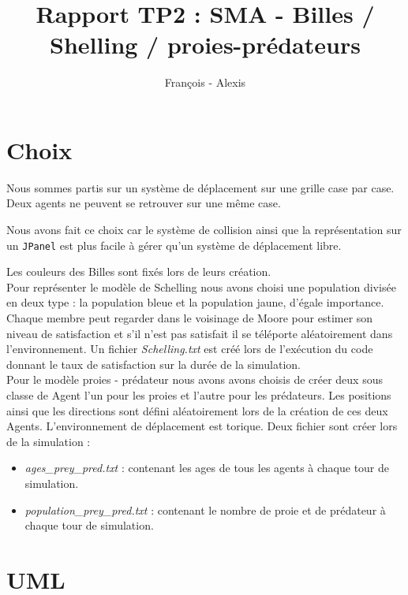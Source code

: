 \documentclass[a4paper,10pt]{article}
\title{Rapport TP2 : SMA - Billes / Shelling / proies-pr\'edateurs }
\author{Fran\c{c}ois \bsc{Lepan} - Alexis \bsc{Linke}}
\begin{document}
\maketitle

\section{Choix}

Nous sommes partis sur un syst\`eme de d\'eplacement sur une grille case par case. Deux agents ne peuvent  se retrouver sur une m\^eme case.

Nous avons fait ce choix car le syst\`eme de collision ainsi que la repr\'esentation sur un \verb&JPanel& est plus facile \`a g\'erer qu'un syst\`eme de d\'eplacement libre.

Les couleurs des Billes sont fix\'es lors de leurs cr\'eation. \\

Pour repr\'esenter le mod\`ele de Schelling nous avons choisi une population divis\'ee en deux type : la population bleue et la population jaune, d'\'egale importance. Chaque membre peut regarder dans le voisinage de Moore pour estimer son niveau de satisfaction et s'il n'est pas satisfait il se t\'el\'eporte al\'eatoirement dans l'environnement. Un fichier \emph{Schelling.txt} est cr\'e\'e lors de l'ex\'ecution du code donnant le taux de satisfaction sur la dur\'ee de la simulation. \\

Pour le mod\`ele proies - pr\'edateur nous avons avons choisis de cr\'eer deux sous classe de Agent l'un pour les proies et l'autre pour les pr\'edateurs. Les positions ainsi que les directions sont d\'efini al\'eatoirement lors de la cr\'eation de ces deux Agents. L'environnement de d\'eplacement est torique.
Deux fichier sont cr\'eer lors de la simulation : \\

\begin{itemize}
\item \emph{ages\_prey\_pred.txt} : contenant les ages de tous les agents \`a chaque tour de simulation.
\item \emph{population\_prey\_pred.txt} : contenant le nombre de proie et de pr\'edateur \`a chaque tour de simulation.
\end{itemize}
\newpage

\section{UML}
\end{document}
